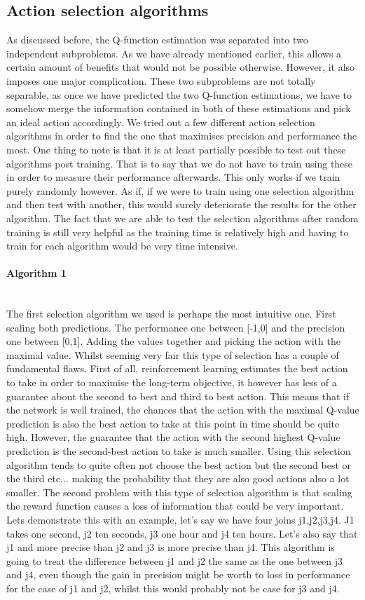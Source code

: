 \subsection{Action selection algorithms}
As discussed before, the Q-function estimation was separated into two independent subproblems. As we have already mentioned earlier, this allows a certain amount of benefits that would not be possible otherwise. However, it also imposes one major complication. These two subproblems are not totally separable, as once we have predicted the two Q-function estimations, we have to somehow merge the information contained in both of these estimations and pick an ideal action accordingly. We tried out a few different action selection algorithms in order to find the one that maximises precision and performance the most. One thing to note is that it is at least partially possible to test out these algorithms post training. That is to say that we do not have to train using these in order to measure their performance afterwards. This only works if we train purely randomly however. As if, if we were to train using one selection algorithm and then test with another, this would surely deteriorate the results for the other algorithm. The fact that we are able to test the selection algorithms after random training is still very helpful as the training time is relatively high and having to train for each algorithm would be very time intensive.
\paragraph{Algorithm 1}\mbox{}\\
The first selection algorithm we used is perhaps the most intuitive one. First scaling both predictions. The performance one between [-1,0] and the precision one between [0,1]. Adding the values together and picking the action with the maximal value. Whilst seeming very fair this type of selection has a couple of fundamental flaws. First of all, reinforcement learning estimates the best action to take in order to maximise the long-term objective, it however has less of a guarantee about the second to best and third to best action. This means that if the network is well trained, the chances that the action with the maximal Q-value prediction is also the best action to take at this point in time should be quite high. However, the guarantee that the action with the second highest Q-value prediction is the second-best action to take is much smaller. Using this selection algorithm tends to quite often not choose the best action but the second best or the third etc... making the probability that they are also good actions also a lot smaller. The second problem with this type of selection algorithm is that scaling the reward function causes a loss of information that could be very important. Lets demonstrate this with an example, let's say we have four joins j1,j2,j3,j4. J1 takes one second, j2 ten seconds, j3 one hour and j4 ten hours. Let's also say that j1 and more precise than j2 and j3 is more precise than j4. This algorithm is going to treat the difference between j1 and j2 the same as the one between j3 and j4, even though the gain in precision might be worth to loss in performance for the case of j1 and j2, whilst this would probably not be case for j3 and j4.
